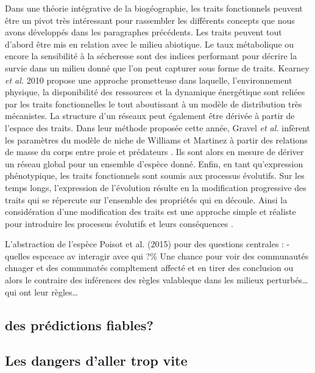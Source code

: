 Dans une théorie intégrative de la biogéographie, les traits
fonctionnels peuvent être un pivot très intéressant pour rassembler les
différents concepts que nous avons développés dans les paragraphes
précédents. Les traits peuvent tout d'abord être mis en relation avec le
milieu abiotique. Le taux métabolique ou encore la sensibilité à la
sécheresse sont des indices performant pour décrire la survie dans un
milieu donné \cite{Kearney2004,Engelbrecht2007} que l'on peut capturer
sous forme de traits. Kearney \textit{et al.} 2010 propose une approche
prometteuse dans laquelle, l'environnement physique, la disponibilité
des ressources et la dynamique énergétique sont reliées par les traits
fonctionnelles le tout aboutissant à un modèle de distribution très
mécanistes. La structure d'un réseaux peut également être dérivée à
partir de l'espace des traits. Dans leur méthode proposée cette année,
Gravel \textit{et al.} infèrent les paramètres du modèle de niche de
Williams et Martinez \cite{Williams2000} à partir des relations de masse
du corps entre proie et prédateurs \cite{Gravel2013}. Ils sont alors en
mesure de dériver un réseau global pour un ensemble d'espèce donné.
Enfin, en tant qu'expression phénotypique, les traits fonctionnels sont
soumis aux processus évolutifs. Sur les temps longs, l'expression de
l'évolution résulte en la modification progressive des traits qui se
répercute sur l'ensemble des propriétés qui en découle. Ainsi la
considération d'une modification des traits est une approche simple et
réaliste pour introduire les processus évolutifs et leurs conséquences
\cite{Guill2008,Loeuille2005}.

L'abstraction de l'espèce Poisot et al. (2015) pour des questions
centrales : - quelles espceace av interagir avce qui ?\% Une chance pour
voir des communautés chnager et des communatés compltement affecté et en
tirer des conclusion ou alors le contraire des inférences des règles
valableque dans les milieux perturbés\ldots{} qui ont leur
règles\ldots{}

\subsection*{des prédictions fiables?}\label{des-pruxe9dictions-fiables}

\subsection*{Les dangers d'aller trop
vite}\label{les-dangers-daller-trop-vite}

